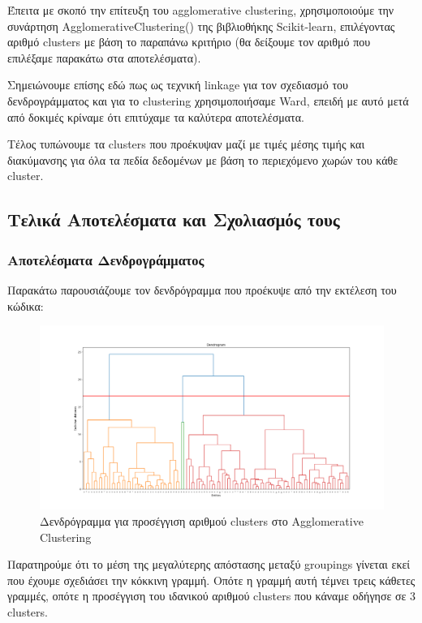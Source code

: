 \documentclass[12pt,a4paper]{article}
\begin{document}
Έπειτα με σκοπό την επίτευξη του agglomerative clustering, χρησιμοποιούμε την συνάρτηση AgglomerativeClustering() της βιβλιοθήκης Scikit-learn, επιλέγοντας αριθμό clusters με βάση το παραπάνω κριτήριο (θα δείξουμε τον αριθμό που επιλέξαμε παρακάτω στα αποτελέσματα).

Σημειώνουμε επίσης εδώ πως ως τεχνική linkage για τον σχεδιασμό του δενδρογράμματος και για το clustering χρησιμοποιήσαμε Ward, επειδή με αυτό μετά από δοκιμές κρίναμε ότι επιτύχαμε τα καλύτερα αποτελέσματα.

Τέλος τυπώνουμε τα clusters που προέκυψαν μαζί με τιμές μέσης τιμής και διακύμανσης για όλα τα πεδία δεδομένων με βάση το περιεχόμενο χωρών του κάθε cluster.

\subsection{Τελικά Αποτελέσματα και Σχολιασμός τους}

\subsubsection{Αποτελέσματα Δενδρογράμματος}

Παρακάτω παρουσιάζουμε τον δενδρόγραμμα που προέκυψε από την εκτέλεση του κώδικα:

\begin{figure}[H]
	\includegraphics[width=\textwidth]{Figures/Question2/1. Dendrogram.png}
	\caption{Δενδρόγραμμα για προσέγγιση αριθμού clusters στο Agglomerative Clustering}
\end{figure}

Παρατηρούμε ότι το μέση της μεγαλύτερης απόστασης μεταξύ groupings γίνεται εκεί που έχουμε σχεδιάσει την κόκκινη γραμμή. Οπότε η γραμμή αυτή τέμνει τρεις κάθετες γραμμές, οπότε η προσέγγιση του ιδανικού αριθμού clusters που κάναμε οδήγησε σε 3 clusters.
\end{document}
